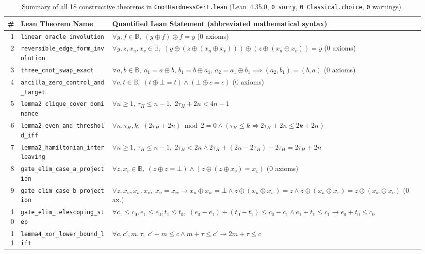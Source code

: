 \documentclass[10pt,twocolumn]{article}
\begin{document}
\begin{table}[t]
\centering
\caption{Summary of all 18 constructive theorems in \texttt{CnotHardnessCert.lean} (Lean~4.35.0, \texttt{0 sorry}, \texttt{0 Classical.choice}, \texttt{0} warnings).}
\label{tab:lean}
\scriptsize
\setlength{\tabcolsep}{3pt}
\begin{tabular}{@{}rll@{}}
\toprule
\# & Lean Theorem Name & Quantified Lean Statement (abbreviated mathematical syntax) \\
\midrule
1 & \texttt{linear\_oracle\_involution} & $\forall y, f \in \mathbb{B},\; (y \oplus f) \oplus f = y$ (0 axioms) \\
2 & \texttt{reversible\_edge\_form\_involution} & $\forall y,z,x_u,x_v \in \mathbb{B},\; (y \oplus (z \oplus (x_u \oplus x_v))) \oplus (z \oplus (x_u \oplus x_v)) = y$ (0 axioms) \\
3 & \texttt{three\_cnot\_swap\_exact} & $\forall a,b \in \mathbb{B},\; a_1=a\oplus b,\, b_1=b\oplus a_1,\, a_2=a_1\oplus b_1 \implies (a_2,b_1)=(b,a)$ (0 axioms) \\
4 & \texttt{ancilla\_zero\_control\_and\_target} & $\forall c,t \in \mathbb{B},\; (t \oplus \bot = t) \land (\bot \oplus c = c)$ (0 axioms) \\
5 & \texttt{lemma2\_clique\_cover\_dominance} & $\forall n \ge 1,\, \tau_H \le n-1,\; 2\tau_H + 2n < 4n - 1$ \\
6 & \texttt{lemma2\_even\_and\_threshold\_iff} & $\forall n,\tau_H,k,\; (2\tau_H+2n)\bmod 2 = 0 \land (\tau_H \le k \iff 2\tau_H+2n \le 2k+2n)$ \\
7 & \texttt{lemma2\_hamiltonian\_interleaving} & $\forall n \ge 1,\, \tau_H \le n-1,\; 2\tau_H < 2n \land 2\tau_H + (2n-2\tau_H) + 2\tau_H = 2\tau_H + 2n$ \\
8 & \texttt{gate\_elim\_case\_a\_projection} & $\forall z, x_v \in \mathbb{B},\; (z \oplus z = \bot) \land (z \oplus (z \oplus x_v) = x_v)$ (0 axioms) \\
9 & \texttt{gate\_elim\_case\_b\_projection} & $\forall z,x_u,x_w,x_v,\; x_u{=}x_w \to x_u{\oplus}x_w{=}\bot \land z{\oplus}(x_u{\oplus}x_w){=}z \land z{\oplus}(x_u{\oplus}x_v){=}z{\oplus}(x_w{\oplus}x_v)$ (0 ax.) \\
10 & \texttt{gate\_elim\_telescoping\_step} & $\forall c_1\le c_0, e_1\le e_0, t_1\le t_0,\; (e_0-e_1)+(t_0-t_1)\le c_0-c_1 \land e_1+t_1\le c_1 \to e_0+t_0\le c_0$ \\
11 & \texttt{lemma4\_xor\_lower\_bound\_lift} & $\forall c,c',m,\tau,\; c'+m \le c \land m+\tau \le c' \to 2m+\tau \le c$ \\

\end{tabular}
\end{table}
\end{document}
